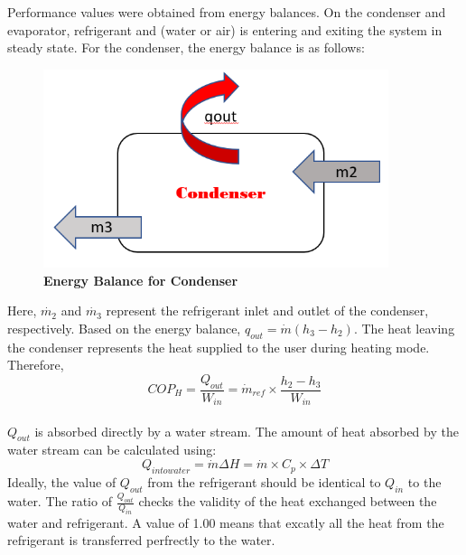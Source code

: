 \documentclass{article}
\begin{document}
Performance values were obtained from energy balances. On the condenser and evaporator, refrigerant and (water or air) is entering and exiting the system in steady state. For the condenser, the energy balance is as follows: 
\begin{figure} [H]
	\centering
	\includegraphics[width=0.9\textwidth]{ebal_condenser}
	\caption{\textbf{Energy Balance for Condenser}}
\end{figure}
Here, $\dot{m_2}$ and $\dot{m_3}$  represent the refrigerant inlet and outlet of the condenser, respectively. Based on the energy balance, $q_{out} = \dot{m} (h_3 - h_2) $. The heat leaving the condenser represents the heat supplied to the user during heating mode. Therefore, $$ COP_H = \frac{Q_{out}}{W_{in}} = \dot{m}_{ref} \times \frac{h_2 - h_3}{W_{in}} $$ \\
$Q_{out}$ is absorbed directly by a water stream. The amount of heat absorbed by the water stream can be calculated using:
$$ Q_{into water} = \dot{m} \Delta{H} = \dot{m} \times C_p \times \Delta T  $$
Ideally, the value of $Q_{out}$ from the refrigerant should be identical to $Q_{in}$ to the water. The ratio of $\frac{Q_{out}}{Q_{in}}$ checks the validity of the heat exchanged between the water and refrigerant. A value of 1.00 means that excatly all the heat from the refrigerant is transferred perfrectly to the water. 
\end{document}
